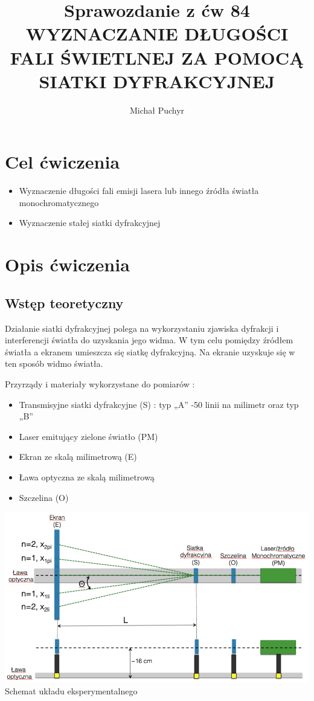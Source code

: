 \documentclass[12pt]{article}
\author{Michał Puchyr}
\title{Sprawozdanie z ćw 84 \\
WYZNACZANIE DŁUGOŚCI FALI ŚWIETLNEJ
ZA POMOCĄ SIATKI DYFRAKCYJNEJ}
\begin{document}
\maketitle

\section{Cel ćwiczenia}
\begin{itemize}
    \item Wyznaczenie długości fali emisji lasera lub innego źródła światła
    monochromatycznego
    \item Wyznaczenie stałej siatki dyfrakcyjnej
\end{itemize}

\section{Opis ćwiczenia}
\subsection{Wstęp teoretyczny}

Działanie siatki dyfrakcyjnej polega na wykorzystaniu zjawiska dyfrakcji i interferencji światła do uzyskania jego widma. 
W tym celu pomiędzy źródłem światła a ekranem umieszcza się siatkę dyfrakcyjną. 
Na ekranie uzyskuje się w ten sposób widmo światła.

Przyrządy i materiały wykorzystane do pomiarów : 

\begin{itemize}
    \item Transmisyjne siatki dyfrakcyjne (S) : typ „A” -50 linii na milimetr oraz typ „B”
    \item Laser emitujący zielone światło (PM)
    \item Ekran ze skalą milimetrową (E)
    \item Ława optyczna ze skalą milimetrową
    \item Szczelina (O)
\end{itemize}

\includegraphics[scale = 0.63]{schemat.png} \\
Schemat układu eksperymentalnego
\end{document}
